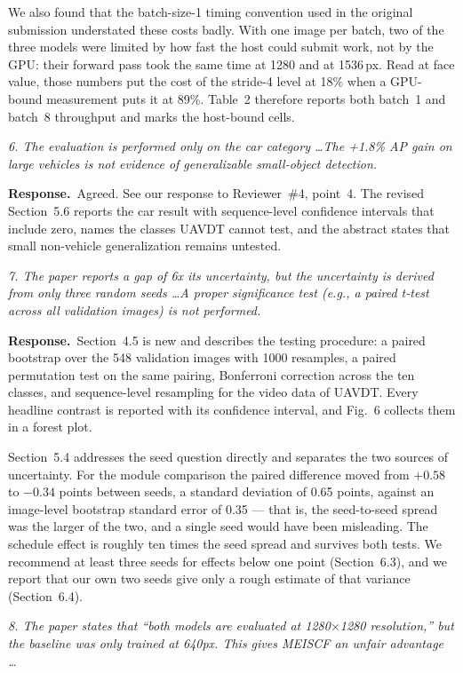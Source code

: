 \documentclass[11pt, a4paper]{article}
\newcommand{\point}[1]{\medskip\noindent\textit{#1}\par}
\newcommand{\reply}{\textbf{Response.}\ }
\begin{document}
We also found that the batch-size-1 timing convention used in the original
submission understated these costs badly. With one image per batch, two of the
three models were limited by how fast the host could submit work, not by the GPU:
their forward pass took the same time at 1280 and at 1536\,px. Read at face value,
those numbers put the cost of the stride-4 level at 18\% when a GPU-bound
measurement puts it at 89\%. Table~2 therefore reports both batch~1 and batch~8
throughput and marks the host-bound cells.

\point{6. The evaluation is performed only on the car category \dots The +1.8\% AP
gain on large vehicles is not evidence of generalizable small-object detection.}

\reply Agreed. See our response to Reviewer~\#4, point~4. The revised
Section~5.6 reports the car result with sequence-level confidence intervals that
include zero, names the classes UAVDT cannot test, and the abstract states that
small non-vehicle generalization remains untested.

\point{7. The paper reports a gap of 6x its uncertainty, but the uncertainty is
derived from only three random seeds \dots A proper significance test (e.g., a
paired t-test across all validation images) is not performed.}

\reply Section~4.5 is new and describes the testing procedure: a paired bootstrap
over the 548 validation images with 1000 resamples, a paired permutation test on
the same pairing, Bonferroni correction across the ten classes, and sequence-level
resampling for the video data of UAVDT. Every headline contrast is reported with
its confidence interval, and Fig.~6 collects them in a forest plot.

Section~5.4 addresses the seed question directly and separates the two sources of
uncertainty. For the module comparison the paired difference moved from $+0.58$ to
$-0.34$ points between seeds, a standard deviation of 0.65 points, against an
image-level bootstrap standard error of 0.35 --- that is, the seed-to-seed spread
was the larger of the two, and a single seed would have been misleading. The
schedule effect is roughly ten times the seed spread and survives both tests. We
recommend at least three seeds for effects below one point (Section~6.3), and we
report that our own two seeds give only a rough estimate of that variance
(Section~6.4).

\point{8. The paper states that ``both models are evaluated at 1280$\times$1280
resolution,'' but the baseline was only trained at 640px. This gives MEISCF an
unfair advantage \dots}
\end{document}
